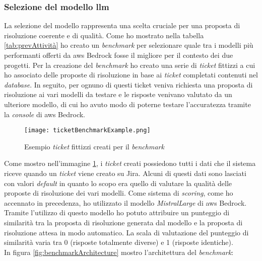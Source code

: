 \subsubsection{Selezione del modello \gls{llm}}
La selezione del modello rappresenta una scelta cruciale per una proposta di risoluzione coerente e di qualità. Come ho mostrato nella tabella \ref{tab:prevAttività} ho creato un \textit{benchmark} per selezionare quale tra i modelli più performanti offerti da \gls{aws} Bedrock fosse il migliore per il contesto dei due progetti.
Per la creazione del \textit{benchmark} ho creato una serie di \textit{ticket} fittizzi a cui ho associato delle proposte di risoluzione in base ai \textit{ticket} completati contenuti nel \textit{database}. In seguito, per ognuno di questi ticket veniva richiesta una proposta di risoluzione ai vari modelli da testare e le risposte venivano valutato da un ulteriore modello, di cui ho avuto modo di poterne testare l'accuratezza tramite la \textit{console} di \gls{aws} Bedrock.
\begin{figure}[H]
    \centering
    \texttt{[image: ticketBenchmarkExample.png]}
    \caption{Esempio \textit{ticket} fittizzi creati per il \textit{benchmark}}
    \label{fig:Ticketbenchmark}
\end{figure}
\noindent
Come mostro nell'immagine \ref{fig:Ticketbenchmark}, i \textit{ticket} creati possiedono tutti i dati che il sistema riceve quando un \textit{ticket} viene creato su Jira. Alcuni di questi dati sono lasciati con valori \textit{default} in quanto lo scopo era quello di valutare la qualità delle proposte di risoluzione dei vari modelli. 
Come sistema di \textit{scoring}, come ho accennato in precedenza, ho utilizzato il modello \textit{MistralLarge} di \gls{aws} Bedrock. Tramite l'utilizzo di questo modello ho potuto attribuire un punteggio di similarità tra la proposta di risoluzione generata dal modello e la proposta di risoluzione attesa in modo automatico. La scala di valutazione del punteggio di similarità varia tra 0 (risposte totalmente diverse) e 1 (risposte identiche). \\
In figura \ref{fig:benchmarkArchitecture} mostro l'architettura del \textit{benchmark}:

